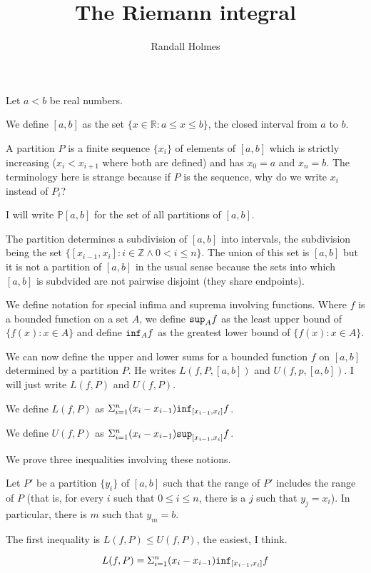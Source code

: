 \documentclass[12pt]{article}
\title{The Riemann integral}
\author{Randall Holmes}
\begin{document}
\maketitle

Let $a<b$ be real numbers.

We define $[a,b]$ as the set $\{x \in \mathbb R:a\leq x \leq b\}$, the closed interval from $a$ to $b$.

A partition $P$ is a finite sequence $\{x_i\}$ of elements of $[a,b]$ which is strictly increasing ($x_i<x_{i+1}$ where both are defined) and has $x_0=a$ and $x_n=b$.  The terminology here is strange because if $P$ is the sequence, why do we write $x_i$ instead of $P_i$?

I will write $\mathbb P[a,b]$ for the set of all partitions of $[a,b]$.

The partition determines a subdivision of $[a,b]$ into intervals, the subdivision being the set $\{[x_{i-1},x_i]:i \in \mathbb Z \wedge 0<i\leq n\}$.   The union of this set is $[a,b]$ but it is not a partition of $[a,b]$ in the usual sense because the sets into which $[a,b]$ is subdvided are not pairwise disjoint (they share endpoints).

We define notation for special infima and suprema involving functions.  Where $f$ is a bounded function on a set $A$, we define ${\tt sup}_A f$ as the least upper bound
of $\{f(x): x\in A\}$ and define ${\tt inf}_A f$ as the greatest lower bound
of $\{f(x): x\in A\}$.

We can now define the upper and lower sums for a bounded function $f$ on $[a,b]$ determined by a partition $P$.  He writes $L(f,P,[a,b])$ and $U(f,p,[a,b])$.  I will just write
$L(f,P)$ and $U(f,P)$.

We define $L(f,P)$ as $\Sigma_{i=1}^n (x_i-x_{i-1}){\tt inf}_{[x_{i-1},x_i]}f$.

We define $U(f,P)$ as $\Sigma_{i=1}^n (x_i-x_{i-1}){\tt sup}_{[x_{i-1},x_i]}f$.

We prove three inequalities involving these notions.  

Let $P'$ be a partition $\{y_i\}$ of $[a,b]$ such that the range of $P'$ includes the range of $P$ (that is, for every $i$ such that $0\leq i \leq n$, there is a $j$ such that $y_j=x_i$).
In particular, there is $m$ such that $y_m=b$.

The first inequality is $L(f,P)\leq U(f,P)$, the easiest, I think.

$$L(f,P) = \Sigma_{i=1}^n (x_i-x_{i-1}){\tt inf}_{[x_{i-1},x_i]}f$$
\end{document}
